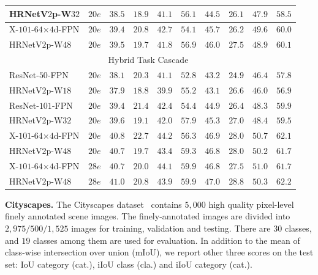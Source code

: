 \documentclass[10pt,journal,compsoc]{IEEEtran}
\begin{document}
\begin{table}[t]
\begin{tabular}{l|c|cccc|cccc}
		HRNetV$2$p-W$32$ & $20e$ & ${38.5}$ & $18.9$ & ${41.1}$ & ${56.1}$ & ${44.5}$ & ${26.1}$ & ${47.9}$ & ${58.5}$  \\
		\hline
	    X-$101$-$64$$\times$$4$d-FPN & $20e$  & $39.4$ & ${20.8}$ & ${42.7}$ & $54.1$ & $45.7$ & $26.2$ & ${49.6}$ & $60.0$  \\
	    
		HRNetV$2$p-W$48$ & $20e$ & ${39.5}$ & $19.7$ & $41.8$ & ${56.9}$ & ${46.0}$ & ${27.5}$ & $48.9$ & ${60.1}$  \\
		
		
		\hline
		\multicolumn{10}{c}{Hybrid Task Cascade~\cite{ChenPWXLSFLSOLL19}}\\
		\hline
		
	    ResNet-$50$-FPN & $20e$  & ${38.1}$ & ${20.3}$ & ${41.1}$ & $52.8$ & ${43.2}$ & $24.9$ & ${46.4}$ & ${57.8}$  \\
	    
		HRNetV$2$p-W$18$ & $20e$ & $37.9$ & $18.8$ & $39.9$ & ${55.2}$ & $43.1$ & ${26.6}$ & $46.0$ & $56.9$  \\
		\hline
	    ResNet-$101$-FPN & $20e$  & $39.4$ & ${21.4}$ & ${42.4}$ & $54.4$ & $44.9$ & $26.4$ & $48.3$ & ${59.9}$  \\
	    
		HRNetV$2$p-W$32$ & $20e$ & ${39.6}$ & $19.1$ & $42.0$ & ${57.9}$ & ${45.3}$ & ${27.0}$ & ${48.4}$ & $59.5$  \\
	    \hline
	    X-$101$-$64$$\times$$4$d-FPN & $20e$ & ${40.8}$ & ${22.7}$ & ${44.2}$ & $56.3$ & ${46.9}$ & ${28.0}$ & ${50.7}$ & ${62.1}$ \\
	    HRNetV$2$p-W$48$ & $20e$ & $40.7$ & $19.7$ & $43.4$ & $59.3$ & $46.8$ & ${28.0}$ & $50.2$ & $61.7$  \\
	    \hline
	    X-$101$-$64$$\times$$4$d-FPN & $28e$ & $40.7$ & $20.0$ & ${44.1}$ & ${59.9}$ & $46.8$ & $27.5$ & ${51.0}$ & $61.7$ \\
	    HRNetV$2$p-W$48$ & $28e$ & ${41.0}$ & ${20.8}$ & $43.9$ & ${59.9}$ & ${47.0}$ & ${28.8}$ & $50.3$ & ${62.2}$  \\
		
		\hline
	\end{tabular}
	\vspace{-0.2cm}
	\end{table}
	

\vspace{.1cm}
\noindent\textbf{Cityscapes.}
The Cityscapes dataset~\cite{CordtsORREBFRS16} contains $5,000$ high quality pixel-level finely annotated scene images.
The finely-annotated images are divided into $2,975/500/1,525$ images for training, validation and testing. 
There are $30$ classes, and $19$ classes among them are used for evaluation. 
In addition to the mean of class-wise intersection over union (mIoU), 
we report other three scores on the test set: 
IoU category (cat.), iIoU class (cla.) and iIoU category (cat.). 
\end{document}
